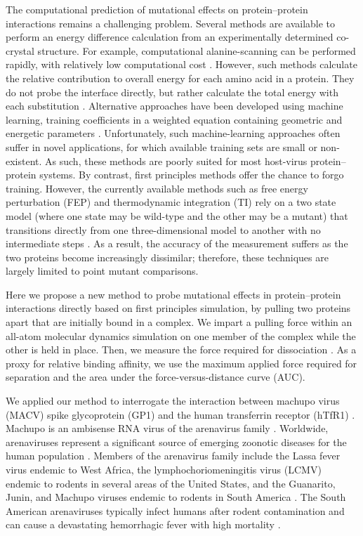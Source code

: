 \documentclass[12pt]{article}
\begin{document}
The computational prediction of mutational effects on protein--protein interactions remains a challenging problem. Several methods are available to perform an energy difference calculation from an experimentally determined co-crystal structure. For example, computational alanine-scanning can be performed rapidly, with relatively low computational cost \citep{Grant2011,Kortemme2004}. However, such methods calculate the relative contribution to overall energy for each amino acid in a protein. They do not probe the interface directly, but rather calculate the total energy with each substitution \citep{Grant2011,Kortemme2004}. Alternative approaches have been developed using machine learning, training coefficients in a weighted equation containing geometric and energetic parameters \citep{Vreven2011,Vreven2012,Bajaj2011,Hwang2010}. Unfortunately, such machine-learning approaches often suffer in novel applications, for which available training sets are small or non-existent. As such, these methods are poorly suited for most host-virus protein--protein systems. By contrast, first principles methods offer the chance to forgo training. However, the currently available methods such as free energy perturbation (FEP) and thermodynamic integration (TI) rely on a two state model (where one state may be wild-type and the other may be a mutant) that transitions directly from one three-dimensional model to another with no intermediate steps \citep{Gilson1997,Lu2004,Chodera2011,Gumbart2013}. As a result, the accuracy of the measurement suffers as the two proteins become increasingly dissimilar; therefore, these techniques are largely limited to point mutant comparisons.

Here we propose a new method to probe mutational effects in protein--protein interactions directly based on first principles simulation, by pulling two proteins apart that are initially bound in a complex. We impart a pulling force within an all-atom molecular dynamics simulation on one member of the complex while the other is held in place. Then, we measure the force required for dissociation \citep{Gumbart2012,Lu1999,Park2004,Is2001A,Is2001B}. As a proxy for relative binding affinity, we use the maximum applied force required for separation and the area under the force-versus-distance curve (AUC). 

We applied our method to interrogate the interaction between machupo virus (MACV) spike glycoprotein (GP1) and the human transferrin receptor (hTfR1) \citep{Abraham2010,Charrel2003}. Machupo is an ambisense RNA virus of the arenavirus family \citep{Charrel2003}. Worldwide, arenaviruses represent a significant source of emerging zoonotic diseases for the human population \citep{Charrel2003}. Members of the arenavirus family include the Lassa fever virus endemic to West Africa, the lymphochoriomeningitis virus (LCMV) endemic to rodents in several areas of the United States, and the Guanarito, Junin, and Machupo viruses endemic to rodents in South America \citep{Charrel2003}. The South American arenaviruses typically infect humans after rodent contamination and can cause a devastating hemorrhagic fever with high mortality \citep{Charrel2003}.
\end{document}
